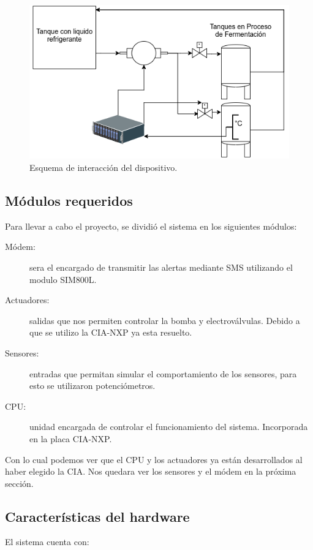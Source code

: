 \begin{figure}[!htb]
  \centering
  \includegraphics[scale=0.3]{./Figures/diagrama_del_sistema.png}
  \caption{Esquema de interacción del dispositivo.}
  \label{fig:diagrama_sistema}
\end{figure}

\subsection{ Módulos requeridos}
Para llevar a cabo el proyecto, se dividió el sistema en los siguientes módulos:
\begin{description}
  \item[Módem:] sera el encargado de transmitir las alertas mediante SMS utilizando el modulo SIM800L.
  \item[Actuadores:] salidas que nos permiten controlar la bomba y electroválvulas. Debido a que se utilizo la CIA-NXP ya esta resuelto.
  \item[Sensores:] entradas que permitan simular el comportamiento de los sensores, para esto se utilizaron potenciómetros.
  \item[CPU:] unidad encargada de controlar el funcionamiento del sistema. Incorporada en la placa CIA-NXP. 
\end{description}

Con lo cual podemos ver que el CPU y los actuadores ya están desarrollados al haber elegido la CIA. Nos quedara ver los sensores y el módem en la próxima sección.

\subsection{Características del hardware}
El sistema cuenta con:

